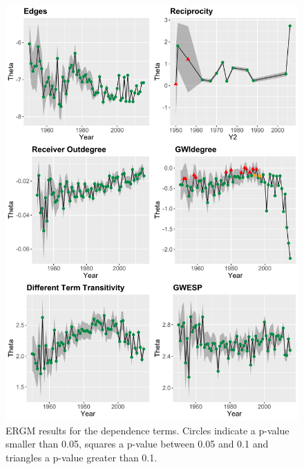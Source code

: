 \documentclass[headsepline=true, abstracton]{scrartcl}
\begin{document}
   
  \begin{figure}[H]
\includegraphics[width=16cm]{SCC_Results_1}
\caption{ERGM results for the dependence terms. Circles indicate a p-value smaller than 0.05, squares a p-value between 0.05 and 0.1 and triangles a p-value greater than 0.1. }
 \label{SCC_results_1}

\vspace{-.25cm}
\end{figure}  
\end{document}
